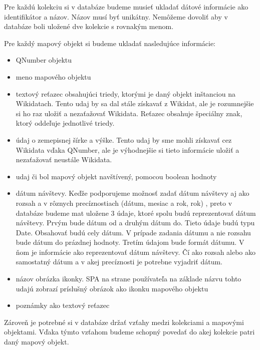 Pre každú kolekciu si v databáze budeme musieť ukladať dátové informácie ako identifikátor a názov. 
Názov musí byť unikátny. Nemôžeme dovoliť aby v databáze boli uložené dve kolekcie s rovnakým menom.

Pre každý mapový objekt si budeme ukladať nasledujúce informácie:
\begin{itemize}
      \item QNumber objektu
      \item meno mapového objektu
      \item textový reťazec obsahujúci triedy, ktorými je daný objekt inštanciou na Wikidatach.
            Tento udaj by sa dal stále získavať z Wikidat, ale je rozumnejšie si ho raz uložiť a nezaťažovať Wikidata.
            Reťazec obsahuje špeciálny znak, ktorý oddeľuje jednotlivé triedy.
      \item údaj o zemepisnej šírke a výške. Tento udaj by sme mohli získavať cez Wikidata vďaka QNumber, ale je výhodnejšie si tieto informácie uložiť a nezaťažovať neustále Wikidata.
      \item udaj či bol mapový objekt navštívený, pomocou boolean hodnoty
      \item dátum návštevy. Keďže podporujeme možnosť zadať dátum návštevy aj ako rozsah a v rôznych precíznostiach (dátum, mesiac a rok, rok)
            , preto v databáze budeme mat uložene 3 údaje, ktoré spolu budú reprezentovať dátum návštevy. Prvým bude dátum od a druhým dátum do. Tieto
            údaje budú typu Date. Obsahovať budú cely dátum. V prípade zadania dátumu a nie rozsahu bude dátum do prázdnej hodnoty. Tretím údajom bude formát dátumu. V ňom je
            informácie ako reprezentovať dátum návštevy. Čí ako rozsah alebo ako samostatný dátum a v akej precíznosti je potrebne vyjadriť dátum.
      \item názov obrázka ikonky. SPA na strane používateľa na základe názvu tohto udajú zobrazí príslušný obrázok ako ikonku mapového objektu
      \item poznámky ako textový reťazec
\end{itemize}

Zároveň je potrebné si v databáze držať vzťahy medzi kolekciami a mapovými objektami. Vďaka týmto vzťahom budeme schopný povedať do akej kolekcie patri daný mapový objekt. 










